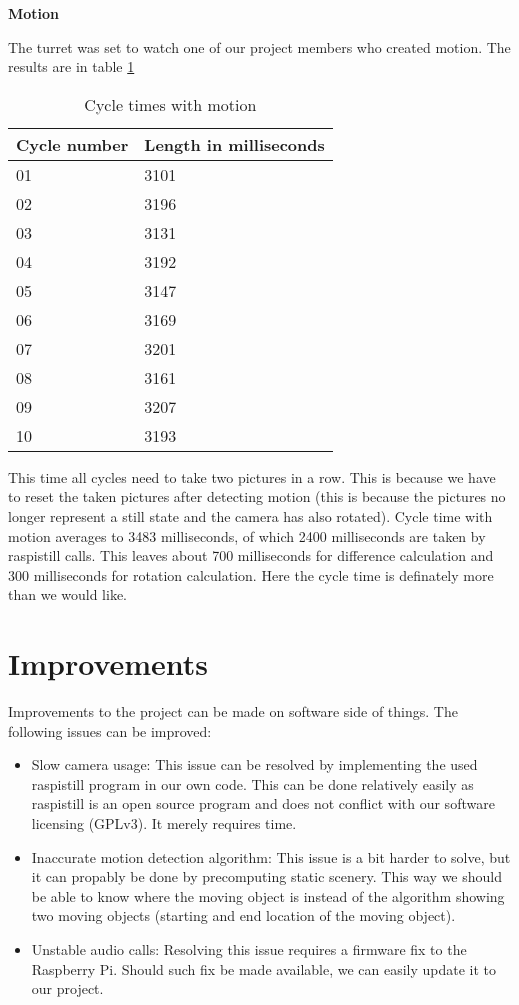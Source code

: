 \documentclass[english,11pt,twoside,a4paper]{article}
\begin{document}
\textbf{Motion}

The turret was set to watch one of our project members who created motion. The results are in table \ref{cycle_times_motion}

\begin{table}[ht]
  \begin{center}
    \begin{tabular}{| l | l |}
      \hline
      Cycle number & Length in milliseconds \\ \hline
      01 & 3101 \\ \hline
      02 & 3196 \\ \hline
      03 & 3131 \\ \hline
      04 & 3192 \\ \hline
      05 & 3147 \\ \hline
      06 & 3169 \\ \hline
      07 & 3201 \\ \hline
      08 & 3161 \\ \hline
      09 & 3207 \\ \hline
      10 & 3193 \\ \hline
    \end{tabular}
    \caption{Cycle times with motion}
  \end{center}
  \label{cycle_times_motion}
\end{table}

This time all cycles need to take two pictures in a row. This is because we have to reset the taken pictures after detecting motion (this is because the pictures no longer represent a still state and the camera has also rotated). Cycle time with motion averages to 3483 milliseconds, of which 2400 milliseconds are taken by raspistill calls. This leaves about 700 milliseconds for difference calculation and 300 milliseconds for rotation calculation. Here the cycle time is definately more than we would like.

\section{Improvements}

Improvements to the project can be made on software side of things. The following issues can be improved:

\begin{itemize}
  \item Slow camera usage: This issue can be resolved by implementing the used raspistill program in our own code. This can be done relatively easily as raspistill is an open source program and does not conflict with our software licensing (GPLv3). It merely requires time.
  \item Inaccurate motion detection algorithm: This issue is a bit harder to solve, but it can propably be done by precomputing static scenery. This way we should be able to know where the moving object is instead of the algorithm showing two moving objects (starting and end location of the moving object).
  \item Unstable audio calls: Resolving this issue requires a firmware fix to the Raspberry Pi. Should such fix be made available, we can easily update it to our project.
\end{itemize}
\end{document}
